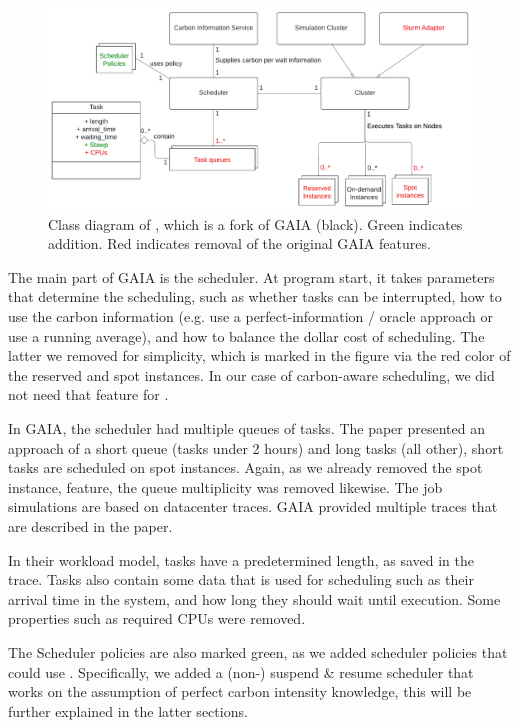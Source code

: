 \begin{figure}
    \includegraphics[width=\linewidth]{images/MA Thesis Diagram.pdf}
    \caption{Class diagram of \programname{}, which is a fork of GAIA (black). Green indicates addition. Red indicates removal of the original GAIA features.}
    \label{fig:class_diagram}
\end{figure}

The main part of GAIA is the scheduler. At program start, it takes parameters that determine the scheduling, such as whether tasks can be interrupted, how to use the carbon information (e.g. use a perfect-information / oracle approach or use a running average), and how to balance the dollar cost of scheduling. 
The latter we removed for simplicity, which is marked in the figure via the red color of the reserved and spot instances. 
In our case of carbon-aware scheduling, we did not need that feature for \programname{}.

In GAIA, the scheduler had multiple queues of tasks. 
The paper presented an approach of a short queue (tasks under 2 hours) and long tasks (all other), short tasks are scheduled on spot instances. 
Again, as we already removed the spot instance, feature, the queue multiplicity was removed likewise.
The job simulations are based on datacenter traces. GAIA provided multiple traces that are described in the paper.

In their workload model, tasks have a predetermined length, as saved in the trace. 
Tasks also contain some data that is used for scheduling such as their arrival time in the system, and how long they should wait until execution. 
Some properties such as required CPUs were removed.

The Scheduler policies are also marked green, as we added scheduler policies that could use \modelname. Specifically, we added a (non-) suspend \& resume scheduler that works on the assumption of perfect carbon intensity knowledge, this will be further explained in the latter sections.


